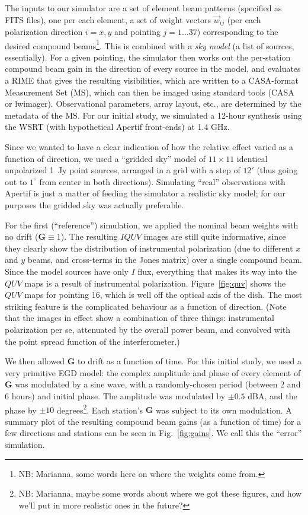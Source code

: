 \documentclass[10pt]{article}
\begin{document}
The inputs to our simulator are a set of element beam patterns (specified as FITS files), one per each element, a set of weight vectors $\vec w_{ij}$ (per each polarization direction $i=x,y$ and pointing $j=1\ldots37$) corresponding to the desired compound beams\footnote{NB: Marianna, some words here on where the weights come from.}. This is combined with a {\em sky model} (a list of sources, essentially). For a given pointing, the simulator then works out the per-station compound beam gain in the direction of every source in the model, and evaluates a RIME that gives the resulting visibilities, which are written to a CASA-format Measurement Set (MS), which can then be imaged using standard tools (CASA or lwimager). Observational parameters, array layout, etc., are determined by the metadata of the MS. For our initial study, we simulated a 12-hour synthesis using the WSRT (with hypothetical Apertif front-ends) at 1.4 GHz. 

Since we wanted to have a clear indication of how the relative effect varied as a function of direction, we used a ``gridded sky'' model of $11\times11$ identical unpolarized 1~Jy point sources, arranged in a grid with a step of $12'$ (thus going out to $1^\circ$ from center in both directions). Simulating ``real'' observations with Apertif is just a matter of feeding the simulator a realistic sky model; for our purposes the gridded sky was actually preferable.

For the first (``reference'') simulation, we applied the nominal beam weights with no drift ($\mathbf{G}\equiv1$). The resulting $IQUV$ images are still quite informative, since they clearly show the distribution of instrumental polarization (due to different $x$ and $y$ beams, and cross-terms in the Jones matrix) over a single compound beam. Since the model sources have only $I$ flux, everything that makes its way into the $QUV$ maps is a result of instrumental polarization. Figure~\ref{fig:quv} shows the $QUV$ maps for pointing 16, which is well off the optical axis of the dish. The most striking feature is the complicated behaviour as a function of direction. (Note that the images in effect show a combination of three things: instrumental polarization per se, attenuated by the overall power beam, and convolved with the point spread function of the interferometer.) 

We then allowed $\mathbf{G}$ to drift as a function of time. For this initial study, we used a very primitive EGD model: the complex amplitude and phase of every element of $\mathbf{G}$ was modulated by a  sine wave, with a randomly-chosen period (between 2 and 6 hours) and initial phase. The amplitude was modulated by $\pm0.5$ dBA, and the phase by $\pm10$ degrees\footnote{NB: Marianna, maybe some words about where we got these figures, and how we'll put in more realistic ones in the future?}. Each station's $\mathbf{G}$ was subject to its own modulation. A summary plot of the resulting compound beam gains (as a function of time) for a few directions and stations can be seen in Fig.~\ref{fig:gains}. We call this the ``error'' simulation.
\end{document}
